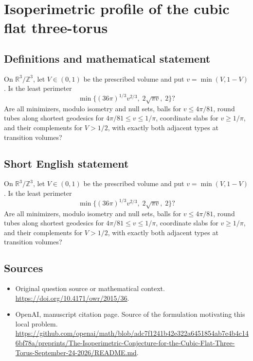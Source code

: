 \documentclass[11pt]{article}
\begin{document}
\section*{Isoperimetric profile of the cubic flat three-torus}\label{statement}
\subsection{Definitions and mathematical statement}
On $\mathbb R^3/\mathbb Z^3$, let $V\in(0,1)$ be the prescribed volume and put $v=\min(V,1-V)$. Is the least perimeter
\[\min\bigl\{(36\pi)^{1/3}v^{2/3},\;2\sqrt{\pi v},\;2\bigr\}?\]
Are all minimizers, modulo isometry and null sets, balls for $v\leq4\pi/81$, round tubes along shortest geodesics for $4\pi/81\leq v\leq1/\pi$, coordinate slabs for $v\geq1/\pi$, and their complements for $V>1/2$, with exactly both adjacent types at transition volumes?
\subsection{Short English statement}
On $\mathbb R^3/\mathbb Z^3$, let $V\in(0,1)$ be the prescribed volume and put $v=\min(V,1-V)$. Is the least perimeter
\[\min\bigl\{(36\pi)^{1/3}v^{2/3},\;2\sqrt{\pi v},\;2\bigr\}?\]
Are all minimizers, modulo isometry and null sets, balls for $v\leq4\pi/81$, round tubes along shortest geodesics for $4\pi/81\leq v\leq1/\pi$, coordinate slabs for $v\geq1/\pi$, and their complements for $V>1/2$, with exactly both adjacent types at transition volumes?
\subsection{Sources}
\begin{itemize}
\item[S1] Original question source or mathematical context.
\url{https://doi.org/10.4171/owr/2015/36}.
\item[S2] OpenAI, manuscript citation page. Source of the formulation motivating this local problem.
\url{https://github.com/openai/math/blob/adc7f1241b42e322a6451854ab7e4b4c146bf78a/preprints/The-Isoperimetric-Conjecture-for-the-Cubic-Flat-Three-Torus-September-24-2026/README.md}.
\end{itemize}
\end{document}
